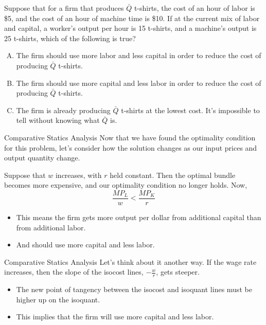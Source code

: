 \documentclass[11pt,t]{beamer}
\begin{document}
\begin{frame}

  \bigskip
  Suppose that for a firm that produces $\bar{Q}$ t-shirts, the cost of an hour of labor is \$5, and the cost of an hour of machine time is \$10. If at the current mix of labor and capital, a worker's output per hour is 15 t-shirts, and a machine's output is 25 t-shirts, which of the following is true?

  \bigskip
  \begin{enumerate}[A)]
    \item The firm should use more labor and less capital in order to reduce the cost of producing $\bar{Q}$ t-shirts.
    \item The firm should use more capital and less labor in order to reduce the cost of producing $\bar{Q}$ t-shirts.
    \item The firm is already producing $\bar{Q}$ t-shirts at the lowest cost.
    It's impossible to tell without knowing what $\bar{Q}$ is.
  \end{enumerate}
\end{frame}

\begin{frame}{Comparative Statics Analysis}
  Now that we have found the optimality condition for this problem, let's consider how the solution changes as our input prices and output quantity change.
  
  \bigskip
  Suppose that $w$ increases, with $r$ held constant. Then the optimal bundle becomes more expensive, and our optimality condition no longer holds. Now,
  $$
    \frac{MP_L}{w} < \frac{MP_K}{r}
  $$

  \pause 
  \begin{itemize}
    \item This means the firm gets more output per dollar from additional capital than from additional labor.
    
    \item And should use more capital and less labor.
  \end{itemize}
\end{frame}

\begin{frame}{Comparative Statics Analysis}
  Let's think about it another way. If the wage rate increases, then the slope of the isocost lines, $-\frac{w}{r}$, gets steeper.

  \pause
  \begin{itemize}
    \item The new point of tangency between the isocost and isoquant lines must be higher up on the isoquant.
    \item This implies that the firm will use more capital and less labor.
  \end{itemize}
\end{frame}
\end{document}
